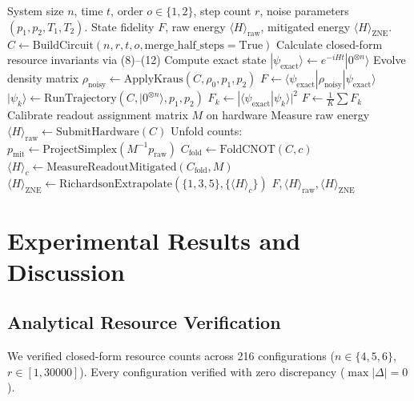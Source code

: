 \documentclass[conference]{IEEEtran}
\begin{document}
\begin{small}
\begin{algorithmic}[1]
\REQUIRE System size $n$, time $t$, order $o \in \{1, 2\}$, step count $r$, noise parameters $(p_1, p_2, T_1, T_2)$.
\ENSURE State fidelity $F$, raw energy $\langle H \rangle_{\text{raw}}$, mitigated energy $\langle H \rangle_{\text{ZNE}}$.
\STATE $C \leftarrow \text{BuildCircuit}(n, r, t, o, \text{merge\_half\_steps}=\text{True})$
\STATE Calculate closed-form resource invariants via (8)--(12)
    \STATE Compute exact state $|\psi_{\text{exact}}\rangle \leftarrow e^{-i H t} |0^{\otimes n}\rangle$
    \STATE Evolve density matrix $\rho_{\text{noisy}} \leftarrow \text{ApplyKraus}(C, \rho_0, p_1, p_2)$
    \STATE $F \leftarrow \langle \psi_{\text{exact}} | \rho_{\text{noisy}} | \psi_{\text{exact}} \rangle$
\ELSE
        \STATE $|\psi_k\rangle \leftarrow \text{RunTrajectory}(C, |0^{\otimes n}\rangle, p_1, p_2)$
        \STATE $F_k \leftarrow |\langle \psi_{\text{exact}} | \psi_k \rangle|^2$
    \ENDFOR
    \STATE $F \leftarrow \frac{1}{K} \sum F_k$
\ENDIF
\STATE Calibrate readout assignment matrix $M$ on hardware
\STATE Measure raw energy $\langle H \rangle_{\text{raw}} \leftarrow \text{SubmitHardware}(C)$
\STATE Unfold counts: $p_{\text{mit}} \leftarrow \text{ProjectSimplex}(M^{-1} p_{\text{raw}})$
    \STATE $C_{\text{fold}} \leftarrow \text{FoldCNOT}(C, c)$
    \STATE $\langle H \rangle_c \leftarrow \text{MeasureReadoutMitigated}(C_{\text{fold}}, M)$
\ENDFOR
\STATE $\langle H \rangle_{\text{ZNE}} \leftarrow \text{RichardsonExtrapolate}(\{1, 3, 5\}, \{\langle H \rangle_c\})$
\RETURN $F, \langle H \rangle_{\text{raw}}, \langle H \rangle_{\text{ZNE}}$
\end{algorithmic}
\end{small}

\section{Experimental Results and Discussion}

\subsection{Analytical Resource Verification}
We verified closed-form resource counts across 216 configurations ($n \in \{4, 5, 6\}$, $r \in [1, 30000]$). Every configuration verified with zero discrepancy ($\max |\Delta| = 0$).
\end{document}
